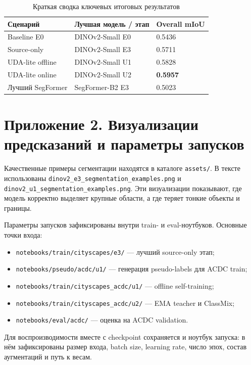 \documentclass[14pt,a4paper]{extarticle}
\begin{document}
\begin{table}[H]
    \centering
    \caption{Краткая сводка ключевых итоговых результатов}
    \label{tab:appendix_key_results}
    \small
    \begin{tabular}{lll}
        \toprule
        Сценарий & Лучшая модель / этап & Overall mIoU \\
        \midrule
        Baseline E0 & DINOv2-Small E0 & 0.5436 \\
        Source-only & DINOv2-Small E3 & 0.5711 \\
        UDA-lite offline & DINOv2-Small U1 & 0.5828 \\
        UDA-lite online & DINOv2-Small U2 & \textbf{0.5957} \\
        Лучший SegFormer & SegFormer-B2 E3 & 0.5023 \\
        \bottomrule
    \end{tabular}
\end{table}

\newpage

\section*{Приложение 2. Визуализации предсказаний и параметры запусков}

Качественные примеры сегментации находятся в каталоге \texttt{assets/}. В тексте использованы \texttt{dinov2\_e3\_segmentation\_examples.png} и \texttt{dinov2\_u1\_segmentation\_examples.png}. Эти визуализации показывают, где модель корректно выделяет крупные области, а где теряет тонкие объекты и границы.

Параметры запусков зафиксированы внутри train- и eval-ноутбуков. Основные точки входа:
\begin{itemize}
    \item \texttt{notebooks/train/cityscapes/e3/} --- лучший source-only этап;
    \item \texttt{notebooks/pseudo/acdc/u1/} --- генерация pseudo-labels для ACDC train;
    \item \texttt{notebooks/train/cityscapes\_acdc/u1/} --- offline self-training;
    \item \texttt{notebooks/train/cityscapes\_acdc/u2/} --- EMA teacher и ClassMix;
    \item \texttt{notebooks/eval/acdc/} --- оценка на ACDC validation.
\end{itemize}

Для воспроизводимости вместе с checkpoint сохраняется и ноутбук запуска: в нём зафиксированы размер входа, batch size, learning rate, число эпох, состав аугментаций и путь к весам.
\end{document}
